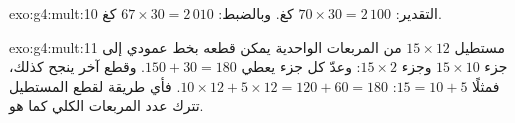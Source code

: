 \begin{solution}{exo:g4:mult:10}
التقدير: $70 \times 30 = 2\,100$ كغ. وبالضبط:
$67 \times 30 = 2\,010$ كغ.
\end{solution}

\begin{solution}{exo:g4:mult:11}
مستطيل $15 \times 12$ من المربعات الواحدية يمكن قطعه بخط
عمودي إلى جزء $15 \times 10$ وجزء $15 \times 2$: وعدّ
كل جزء يعطي $150 + 30 = 180$. وقطع آخر ينجح كذلك،
فمثلًا $15 = 10 + 5$: $10 \times 12 + 5 \times 12 = 120 + 60
= 180$. فأي طريقة لقطع المستطيل تترك عدد المربعات
الكلي كما هو.
\end{solution}
